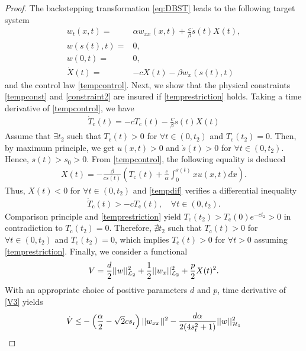 \documentclass[journal]{IEEEtran}
\begin{document}
\begin{proof}
The backstepping  transformation \eqref{eq:DBST} leads to the following target system \begin{align}\label{tarTPDE}
w_t(x,t)=&\alpha w_{xx}(x,t)+\frac{c}{\beta}\dot{s}(t) X(t), \\
\label{tarTBC1}
w(s(t),t) =& 0,\\
\label{tarTBC2}w(0,t) =& 0, \\
\label{tarTODE}\dot{X}(t)=&-cX(t)-\beta w_x(s(t),t)
\end{align}
and the control law \eqref{tempcontrol}. Next, we show that the physical constraints \eqref{tempconst} and \eqref{constraint2} are insured if \eqref{temprestriction} holds. 
Taking a time derivative of \eqref{tempcontrol}, we have 
\begin{align}\label{tempdif}
\dot{T}_{{\mathrm c}}(t)=-c T_{{\mathrm c}}(t)-\frac{c}{\beta}\dot{s}(t)X(t)
\end{align}
Assume that $\exists t_2$ such that $T_{{\mathrm c}}(t)>0$ for $\forall t\in(0,t_2)$ and $T_{{\mathrm c}}(t_2) = 0$. Then, by maximum principle, we get  $u(x,t)>0$ and $\dot{s}(t)>0$ for $\forall t\in(0,t_2)$. Hence, $s(t)>s_0>0$. From \eqref{tempcontrol}, the following equality is deduced 
\begin{align}
X(t)=-\frac{\beta}{cs(t)}\left(T_{{\mathrm c}}(t)+\frac{c}{\alpha} \int_{0}^{s(t)} xu(x,t) dx\right).
\end{align}
Thus, $X(t)<0$ for $\forall t\in(0,t_2)$ and  \eqref{tempdif} verifies a differential inequality 
\begin{align}
\dot{T}_{{\mathrm c}}(t)> -c T_{{\mathrm c}}(t), \quad \forall t\in(0,t_2).
\end{align}
Comparison principle and \eqref{temprestriction} yield $T_{{\mathrm c}}(t_2) > T_{{\mathrm c}}(0) e^{-c t_2}>0$ in contradiction to  $T_{{\mathrm c}}(t_2) = 0$. Therefore, $\nexists t_2$ such that $T_{{\mathrm c}}(t)>0$ for $\forall t\in(0,t_2)$ and $T_{{\mathrm c}}(t_2) = 0$, which implies $T_{{\mathrm c}}(t)>0$ for $\forall t>0$ assuming \eqref{temprestriction}. 
Finally, we consider a functional 
\begin{align}\label{V3}
V = \frac{d}{2}||w||_{{\cal L}_2}^2 + \frac{1}{2}||w_{x}||_{{\cal L}_2}^2 + \frac{p}{2} X(t)^2. 
\end{align}
With an appropriate choice of positive parameters $d$ and $p$, time derivative of \eqref{V3} yields 
\begin{align}
\dot{V} \leq& - \left(\frac{\alpha}{2} -\sqrt{2} cs_{{\mathrm r}} \right) || w_{xx}||^2- \frac{d\alpha}{2(4s_{{\mathrm r}}^2 + 1)}  ||w||_{{\cal H}_1}^2 \notag\\

\end{align}
\end{proof}
\end{document}
